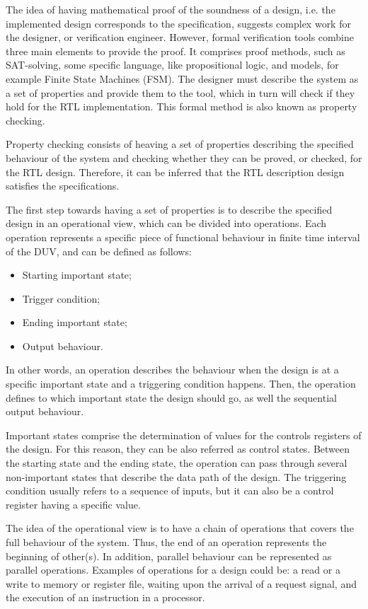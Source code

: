 The idea of having mathematical proof of the soundness of a design, i.e. the implemented design corresponds to the specification, suggests complex work for the designer, or verification engineer. However, formal verification tools combine three main elements to provide the proof. It comprises proof methods, such as SAT-solving, some specific language, like propositional logic, and models, for example Finite State Machines (FSM). The designer must describe the system as a set of properties and provide them to the tool, which in turn will check if they hold for the RTL implementation. This formal method is also known as property checking. 

Property checking consists of heaving a set of properties describing the specified behaviour of the system and checking whether they can be proved, or checked, for the RTL design.  Therefore, it can be inferred that the RTL description design satisfies the specifications. 

The first step towards having a set of properties is to describe the specified design in an operational view, which can be divided into operations. Each operation represents a specific piece of functional behaviour in finite time interval of the DUV, and can be defined as follows:

\begin{itemize}
    \item Starting important state;
    \item Trigger condition;
    \item Ending important state;
    \item Output behaviour.
\end{itemize}

In other words, an operation describes the behaviour when the design is at a specific important state and a triggering condition happens. Then, the operation defines to which important state the design should go, as well the sequential output behaviour. 

Important states comprise the determination of values for the controls registers of the design. For this reason, they can be also referred as control states. Between the starting state and the ending state, the operation can pass through several non-important states that describe the data path of the design. The triggering condition usually refers to a sequence of inputs, but it can also be a control register having a specific value.

The idea of the operational view is to have a chain of operations that covers the full behaviour of the system. Thus, the end of an operation represents the beginning of other(s). In addition, parallel behaviour can be represented as parallel operations. Examples of operations for a design could be: a read or a write to memory or register file, waiting upon the arrival of a request signal, and the execution of an instruction in a processor.

